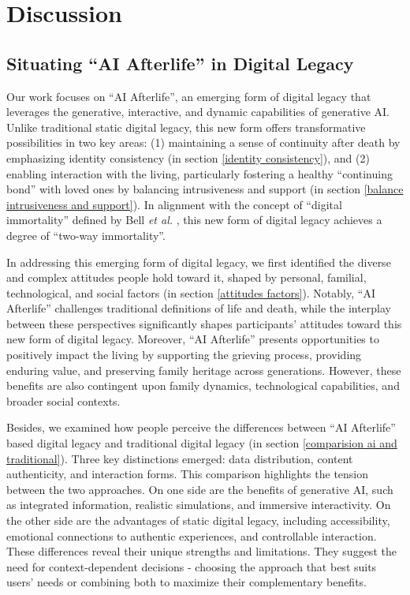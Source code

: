 
\section{Discussion}


\subsection{Situating ``AI Afterlife'' in Digital Legacy}

Our work focuses on ``AI Afterlife'', an emerging form of digital legacy that leverages the generative, interactive, and dynamic capabilities of generative AI. Unlike traditional static digital legacy, this new form offers transformative possibilities in two key areas: (1) maintaining a sense of continuity after death by emphasizing identity consistency (in section \ref{identity consistency}), and (2) enabling interaction with the living, particularly fostering a healthy ``continuing bond'' with loved ones by balancing intrusiveness and support (in section \ref{balance intrusiveness and support}). In alignment with the concept of ``digital immortality'' defined by Bell \textit{et al.} \cite{bell2001digital}, this new form of digital legacy achieves a degree of ``two-way immortality''. 

In addressing this emerging form of digital legacy, we first identified the diverse and complex attitudes people hold toward it, shaped by personal, familial, technological, and social factors (in section \ref{attitudes factors}). Notably, ``AI Afterlife'' challenges traditional definitions of life and death, while the interplay between these perspectives significantly shapes participants' attitudes toward this new form of digital legacy. Moreover, ``AI Afterlife'' presents opportunities to positively impact the living by supporting the grieving process, providing enduring value, and preserving family heritage across generations. However, these benefits are also contingent upon family dynamics, technological capabilities, and broader social contexts.

Besides, we examined how people perceive the differences between ``AI Afterlife'' based digital legacy and traditional digital legacy (in section \ref{comparision ai and traditional}). Three key distinctions emerged: data distribution, content authenticity, and interaction forms. This comparison highlights the tension between the two approaches. On one side are the benefits of generative AI, such as integrated information, realistic simulations, and immersive interactivity. On the other side are the advantages of static digital legacy, including accessibility, emotional connections to authentic experiences, and controllable interaction. These differences reveal their unique strengths and limitations. They suggest the need for context-dependent decisions - choosing the approach that best suits users' needs or combining both to maximize their complementary benefits.

